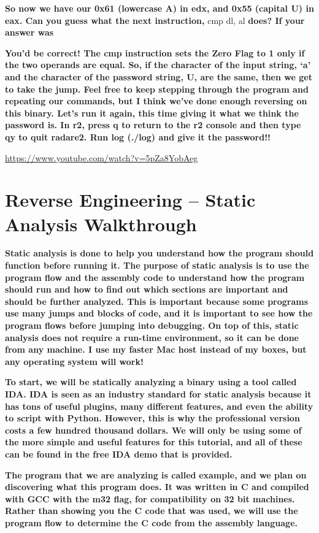\documentclass[letterpaper]{article}
\newcommand{\sitfig}[3]{
\begin{figure}[H]
\centering
\makebox[\textwidth][c]{
#2
}
\label{#1}
\end{figure}
}
\newcommand{\sitgfx}[4][scale=1.0]{
\sitfig{#3}{\texttt{[image: \#2]}}{#4}
}
\begin{document}
\textbf{So now we have our 0x61 (lowercase A) in edx, and 0x55 (capital U) in eax. Can you guess what the next
instruction, }cmp dl, al \textbf{does? If your answer was }  
\sitgfx[width=6.5in,height=1.8055in]{reversing-img043.png}{fig:unk}{TODO CAPTION}
 

\textbf{You'd be correct! The cmp instruction sets the Zero Flag to 1 only if the two operands are equal. So, if the
character of the input string, `a' and the character of the password string, U, are the same, then we get to take the
jump. Feel free to keep stepping through the program and repeating our commands, but I think we've done enough
reversing on this binary. Let's run it again, this time giving it what we think the password is. In r2, press q to
return to the r2 console and then type qy to quit radare2. Run log (./log) and give it the password!! }
\sitgfx[width=6.4165in,height=1.3126in]{reversing-img044.png}{fig:unk}{TODO CAPTION}
\url{https://www.youtube.com/watch?v=5pZa8YobAeg}

\section{Reverse Engineering -- Static Analysis Walkthrough}

\textbf{Static analysis is done to help you understand how the program should function before running it. The purpose of
static analysis is to use the program flow and the assembly code to understand how the program should run and how to
find out which sections are important and should be further analyzed. This is important because some programs use many
jumps and blocks of code, and it is important to see how the program flows before jumping into debugging. On top of
this, static analysis does not require a run-time environment, so it can be done from any machine. I use my faster Mac
host instead of my boxes, but any operating system will work!}

\textbf{To start, we will be statically analyzing a binary using a tool called IDA. IDA is seen as an industry standard
for static analysis because it has tons of useful plugins, many different features, and even the ability to script with
Python. However, this is why the professional version costs a few hundred thousand dollars. We will only be using some
of the more simple and useful features for this tutorial, and all of these can be found in the free IDA demo that is
provided.}

\textbf{The program that we are analyzing is called
}\textbf{\textcolor[rgb]{0.21960784,0.4627451,0.11372549}{example}}\textbf{, and we plan on discovering what this
program does. It was written in C and compiled with GCC with the m32 flag, for compatibility on 32 bit machines. Rather
than showing you the C code that was used, we will use the program flow to determine the C code from the assembly
language.}
\end{document}
